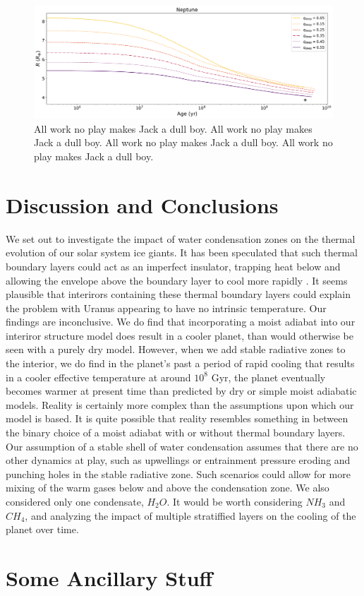\documentclass[11pt]{ucscthesisbs}
\begin{document}
\begin{figure}[ht]
 \centerline{
  \includegraphics[scale=0.45]{figures/n_cooling_radius_nz_4096_logx.png}
 }
\caption[Inhibition of convection on Uranus]
{All work no play makes Jack a dull boy. All work no play makes Jack a dull boy. All work no play makes Jack a dull boy. All work no play makes Jack a dull boy.  }
\label{fig:evolve_neptune_radius}
\end{figure}



\chapter{Discussion and Conclusions}
We set out to investigate the impact of water condensation zones on the thermal evolution of our solar system ice giants. It has been speculated that such thermal boundary layers could act as an imperfect insulator, trapping heat below and allowing the envelope above the boundary layer to cool more rapidly \citep{nettelmann_2016}\citep{friedson_2017}\citep{leconte_2017}\citep{podolak_1991}\citep{scheibe_2019}. It seems plausible that interirors containing these thermal boundary layers could explain the problem with Uranus appearing to have no intrinsic temperature. Our findings are inconclusive. We do find that incorporating a moist adiabat into our interiror structure model does result in a cooler planet, than would otherwise be seen with a purely dry model. However, when we add stable radiative zones to the interior, we do find in the planet's past a period of rapid cooling that results in a cooler effective temperature at around $10^8$ Gyr, the planet eventually becomes warmer at present time than predicted by dry or simple moist adiabatic models. Reality is certainly more complex than the assumptions upon which our model is based. It is quite possible that reality resembles something in between the binary choice of a moist adiabat with or without thermal boundary layers\citep{guillot_2019}. Our assumption of a stable shell of water condensation assumes that there are no other dynamics at play, such as upwellings or entrainment pressure \citep{friedson_2017} eroding and punching holes in the stable radiative zone. Such scenarios could allow for more mixing of the warm gases below and above the condensation zone. We also considered only one condensate, $H_{2}O$. It would be worth considering $NH_{3}$ and $CH_{4}$, and analyzing the impact of multiple stratiffied layers on the cooling of the planet over time.



\appendix
\chapter{Some Ancillary Stuff}

\newcommand{\newblock}{}

\end{document}
